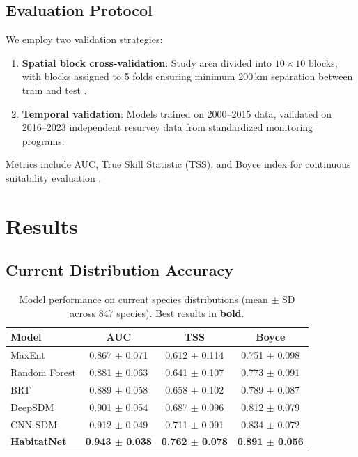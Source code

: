 \documentclass[11pt,a4paper]{article}
\begin{document}
\subsection{Evaluation Protocol}

We employ two validation strategies:
\begin{enumerate}
  \item \textbf{Spatial block cross-validation}: Study area divided into
    $10 \times 10$ blocks, with blocks assigned to 5 folds ensuring
    minimum 200\,km separation between train and test
    \citep{roberts2017cross}.
  \item \textbf{Temporal validation}: Models trained on 2000--2015 data,
    validated on 2016--2023 independent resurvey data from standardized
    monitoring programs.
\end{enumerate}

Metrics include AUC, True Skill Statistic (TSS), and Boyce index for
continuous suitability evaluation \citep{hirzel2006evaluating}.


\section{Results}
\label{sec:results}

\subsection{Current Distribution Accuracy}

\begin{table}[H]
\centering
\caption{Model performance on current species distributions (mean
$\pm$ SD across 847 species). Best results in \textbf{bold}.}
\label{tab:current}
\begin{tabular}{lccc}
\toprule
\textbf{Model} & \textbf{AUC} & \textbf{TSS} & \textbf{Boyce} \\
\midrule
MaxEnt          & 0.867 $\pm$ 0.071 & 0.612 $\pm$ 0.114 & 0.751 $\pm$ 0.098 \\
Random Forest   & 0.881 $\pm$ 0.063 & 0.641 $\pm$ 0.107 & 0.773 $\pm$ 0.091 \\
BRT             & 0.889 $\pm$ 0.058 & 0.658 $\pm$ 0.102 & 0.789 $\pm$ 0.087 \\
DeepSDM         & 0.901 $\pm$ 0.054 & 0.687 $\pm$ 0.096 & 0.812 $\pm$ 0.079 \\
CNN-SDM         & 0.912 $\pm$ 0.049 & 0.711 $\pm$ 0.091 & 0.834 $\pm$ 0.072 \\
\textbf{HabitatNet} & \textbf{0.943 $\pm$ 0.038} & \textbf{0.762 $\pm$ 0.078} & \textbf{0.891 $\pm$ 0.056} \\
\bottomrule
\end{tabular}
\end{table}
\end{document}
